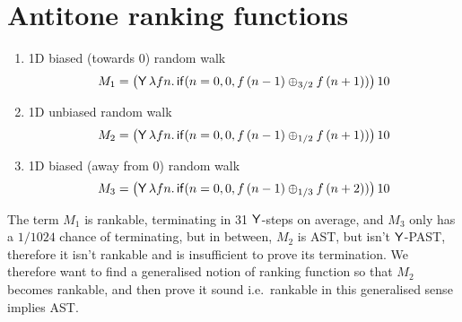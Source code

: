 \section{Antitone ranking functions}
\label{sec:antitone}

\begin{example}
\label{ex:ac-ranking}
\begin{enumerate}
\item 1D biased (towards 0) random walk
\[
M_1 = 
\big(\mathsf{Y} \, \lambda f n . \, 
\mathsf{if}(n = 0, 0, f \, (n - 1) \oplus_{3/2} f \, (n + 1))\big) \, 10
\]

\item 1D unbiased random walk
\[
M_2 = 
\big(\mathsf{Y} \, \lambda f n . \, 
\mathsf{if}(n = 0, 0, f \, (n - 1) \oplus_{1/2} f \, (n + 1))\big) \, 10
\]

\item 1D biased (away from 0) random walk
\[
M_3 = 
\big(\mathsf{Y} \, \lambda f n . \, 
\mathsf{if}(n = 0, 0, f \, (n - 1) \oplus_{1/3} f \, (n + 2))\big) \, 10
\]



\end{enumerate}
\end{example}

The term $M_1$ is rankable, terminating in 31 $\mathsf{Y}$-steps on average, and $M_3$ only has a $1/1024$ chance of terminating, but in between, $M_2$ is AST, but isn't $\mathsf{Y}$-PAST, therefore it isn't rankable and  is insufficient to prove its termination. We therefore want to find a generalised notion of ranking function so that $M_2$ becomes rankable, and then prove it sound i.e.~rankable in this generalised sense implies AST.


